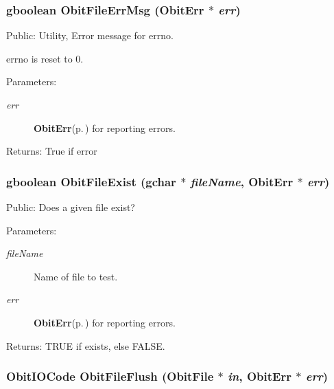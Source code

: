 \subsubsection{\setlength{\rightskip}{0pt plus 5cm}gboolean Obit\-File\-Err\-Msg ({\bf Obit\-Err} $\ast$ {\em err})}\label{ObitFile_8c_a26}


Public: Utility, Error message for errno. 

errno is reset to 0. \begin{Desc}
\item[Parameters:]
\begin{description}
\item[{\em err}]{\bf Obit\-Err}{\rm (p.\,\pageref{structObitErr})} for reporting errors. \end{description}
\end{Desc}
\begin{Desc}
\item[Returns:]True if error \end{Desc}
\subsubsection{\setlength{\rightskip}{0pt plus 5cm}gboolean Obit\-File\-Exist (gchar $\ast$ {\em file\-Name}, {\bf Obit\-Err} $\ast$ {\em err})}\label{ObitFile_8c_a12}


Public: Does a given file exist? 

\begin{Desc}
\item[Parameters:]
\begin{description}
\item[{\em file\-Name}]Name of file to test. \item[{\em err}]{\bf Obit\-Err}{\rm (p.\,\pageref{structObitErr})} for reporting errors. \end{description}
\end{Desc}
\begin{Desc}
\item[Returns:]TRUE if exists, else FALSE. \end{Desc}
\subsubsection{\setlength{\rightskip}{0pt plus 5cm}Obit\-IOCode Obit\-File\-Flush ({\bf Obit\-File} $\ast$ {\em in}, {\bf Obit\-Err} $\ast$ {\em err})}\label{ObitFile_8c_a25}


